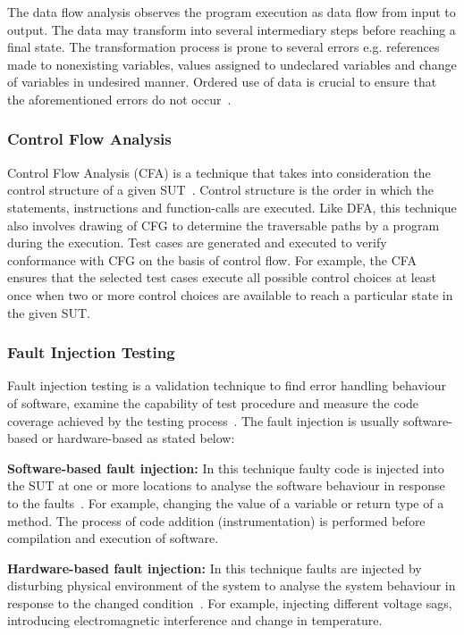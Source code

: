 The data flow analysis observes the program execution as data flow from input to output. The data may transform into several intermediary steps before reaching a final state. The transformation process is prone to several errors e.g. references made to nonexisting variables, values assigned to undeclared variables and change of variables in undesired manner. Ordered use of data is crucial to ensure that the aforementioned errors do not occur~\cite{fosdick1976data}.

\subsubsection{Control Flow Analysis}
Control Flow Analysis (CFA) is a technique that takes into consideration the control structure of a given SUT~\cite{allen1970control}. Control structure is the order in which the statements, instructions and function-calls are executed. Like DFA, this technique also involves drawing of CFG to determine the traversable paths by a program during the execution. Test cases are generated and executed to verify conformance with CFG on the basis of control flow. For example, the CFA ensures that the selected test cases execute all possible control choices at least once when two or more control choices are available to reach a particular state in the given SUT. %

\subsubsection{Fault Injection Testing}
Fault injection testing is a validation technique to find error handling behaviour of software, examine the capability of test procedure and measure the code coverage achieved by the testing process~\cite{arlat1990validation}. The fault injection is usually software-based or hardware-based as stated below:

\textbf{Software-based fault injection:} In this technique faulty code is injected into the SUT at one or more locations to analyse the software behaviour in response to the faults~\cite{voas1997software}. For example, changing the value of a variable or return type of a method. The process of code addition (instrumentation) is performed before compilation and execution of software. 

\textbf{Hardware-based fault injection:} In this technique faults are injected by disturbing physical environment of the system to analyse the system behaviour in response to the changed condition~\cite{hsueh1997fault}. For example, injecting different voltage sags, introducing electromagnetic interference and change in temperature.

